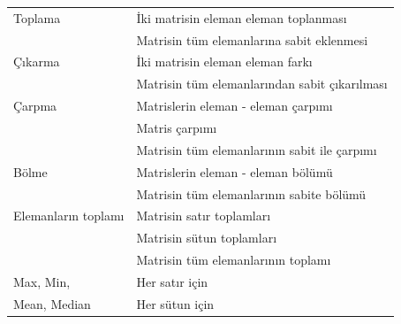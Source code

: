 \begin{longtable}{p{80pt} p{250pt}}
\hline \hline
\endlastfoot
 Toplama 								& İki matrisin eleman eleman toplanması 											\\%
 												& Matrisin tüm elemanlarına sabit eklenmesi										\\%
 Çıkarma 								& İki matrisin eleman eleman farkı 														\\%
 												& Matrisin tüm elemanlarından sabit çıkarılması 							\\%
 Çarpma									& Matrislerin eleman - eleman çarpımı 												\\%
 												& Matris çarpımı 																							\\%
 												& Matrisin tüm elemanlarının sabit ile çarpımı				 				\\%
 Bölme									& Matrislerin eleman - eleman bölümü 													\\%
 												& Matrisin tüm elemanlarının sabite bölümü 						 				\\%
 Elemanların toplamı    & Matrisin satır toplamları 																	\\%
 												& Matrisin sütun toplamları				 														\\%
 												& Matrisin tüm elemanlarının toplamı 													\\%
 Max, Min,  						& Her satır için																							\\%
 Mean, Median						& Her sütun için																							\\%

\end{longtable}

